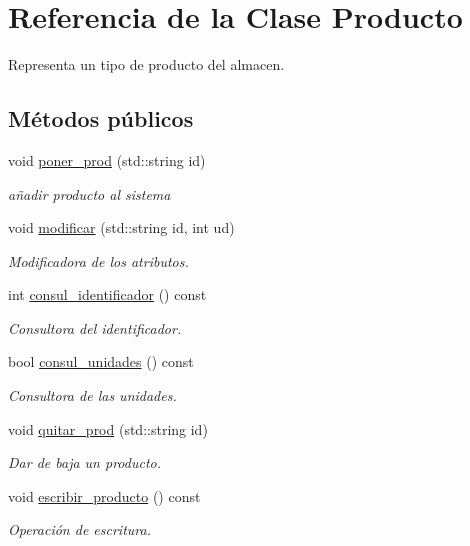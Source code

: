 \hypertarget{class_producto}{}\section{Referencia de la Clase Producto}
\label{class_producto}


Representa un tipo de producto del almacen.  


\subsection*{Métodos públicos}
\begin{DoxyCompactItemize}
\item 
void \mbox{\hyperlink{class_producto_aef5383f676b625125d6d4a754e457af3}{poner\+\_\+prod}} (std\+::string id)
\begin{DoxyCompactList}\small\item\em añadir producto al sistema \end{DoxyCompactList}\item 
void \mbox{\hyperlink{class_producto_ac6a7f69acbcde467e09feccbd3a7af57}{modificar}} (std\+::string id, int ud)
\begin{DoxyCompactList}\small\item\em Modificadora de los atributos. \end{DoxyCompactList}\item 
int \mbox{\hyperlink{class_producto_ae0067962ae16d3c12fb6dda463562245}{consul\+\_\+identificador}} () const
\begin{DoxyCompactList}\small\item\em Consultora del identificador. \end{DoxyCompactList}\item 
bool \mbox{\hyperlink{class_producto_aa26e89579230adf0e1e40460a04ff36f}{consul\+\_\+unidades}} () const
\begin{DoxyCompactList}\small\item\em Consultora de las unidades. \end{DoxyCompactList}\item 
void \mbox{\hyperlink{class_producto_a7223d677ba9a0844072904602fb3b0f1}{quitar\+\_\+prod}} (std\+::string id)
\begin{DoxyCompactList}\small\item\em Dar de baja un producto. \end{DoxyCompactList}\item 
void \mbox{\hyperlink{class_producto_af3546b67d16efa3ddc66caf069f0c3ec}{escribir\+\_\+producto}} () const
\begin{DoxyCompactList}\small\item\em Operación de escritura. \end{DoxyCompactList}\end{DoxyCompactItemize}
